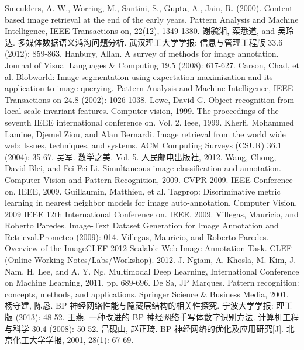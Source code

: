 \begin{thebibliography}{99}
Smeulders, A. W., Worring, M., Santini, S., Gupta, A., Jain, R. (2000). Content-based image retrieval at the end of the early years. Pattern Analysis and Machine Intelligence, IEEE Transactions on, 22(12), 1349-1380.
谢毓湘, 栾悉道, and 吴玲达. 多媒体数据语义鸿沟问题分析. 武汉理工大学学报: 信息与管理工程版 33.6 (2012): 859-863.
Hanbury, Allan. A survey of methods for image annotation. Journal of Visual Languages \& Computing 19.5 (2008): 617-627.
Carson, Chad, et al. Blobworld: Image segmentation using expectation-maximization and its application to image querying. Pattern Analysis and Machine Intelligence, IEEE Transactions on 24.8 (2002): 1026-1038.
Lowe, David G. Object recognition from local scale-invariant features. Computer vision, 1999. The proceedings of the seventh IEEE international conference on. Vol. 2. Ieee, 1999.
Kherfi, Mohammed Lamine, Djemel Ziou, and Alan Bernardi. Image retrieval from the world wide web: Issues, techniques, and systems. ACM Computing Surveys (CSUR) 36.1 (2004): 35-67.
吴军. 数学之美. Vol. 5. 人民邮电出版社, 2012.
Wang, Chong, David Blei, and Fei-Fei Li. Simultaneous image classification and annotation. Computer Vision and Pattern Recognition, 2009. CVPR 2009. IEEE Conference on. IEEE, 2009. %
Guillaumin, Matthieu, et al. Tagprop: Discriminative metric learning in nearest neighbor models for image auto-annotation. Computer Vision, 2009 IEEE 12th International Conference on. IEEE, 2009. %
Villegas, Mauricio, and Roberto Paredes. Image-Text Dataset Generation for Image Annotation and Retrieval.Prometeo (2009): 014.
Villegas, Mauricio, and Roberto Paredes. Overview of the ImageCLEF 2012 Scalable Web Image Annotation Task. CLEF (Online Working Notes/Labs/Workshop). 2012.
J. Ngiam, A. Khosla, M. Kim, J. Nam, H. Lee, and A. Y. Ng, Multimodal Deep Learning, International Conference on Machine Learning, 2011, pp. 689-696.
De Sa, JP Marques. Pattern recognition: concepts, methods, and applications. Springer Science \& Business Media, 2001.
杨守建, 陈恳. BP 神经网络性能与隐藏层结构的相关性探究. 宁波大学学报: 理工版 (2013): 48-52.
王燕. 一种改进的 BP 神经网络手写体数字识别方法. 计算机工程与科学 30.4 (2008): 50-52.
吕砚山, 赵正琦. BP 神经网络的优化及应用研究[J]. 北京化工大学学报, 2001, 28(1): 67-69.

\end{thebibliography}

